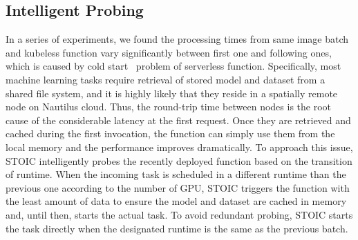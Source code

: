  \subsection{Intelligent Probing}
 In a series of experiments, we found the processing times from same image batch and kubeless function vary significantly between first one and following ones, which is caused by cold start~\cite{ref:coldstart} problem of serverless function. Specifically, most machine learning tasks require retrieval of stored model and dataset from a shared file system, and it is highly likely that they reside in a spatially remote node on Nautilus cloud. Thus, the round-trip time between nodes is the root cause of the considerable latency at the first request. Once they are retrieved and cached during the first invocation, the function can simply use them from the local memory and the performance improves dramatically. To approach this issue, STOIC intelligently probes the recently deployed function based on the transition of runtime. When the incoming task is scheduled in a different runtime than the previous one according to the number of GPU, STOIC triggers the function with the least amount of data to ensure the model and dataset are cached in memory and, until then, starts the actual task. To avoid redundant probing, STOIC starts the task directly when the designated runtime is the same as the previous batch.